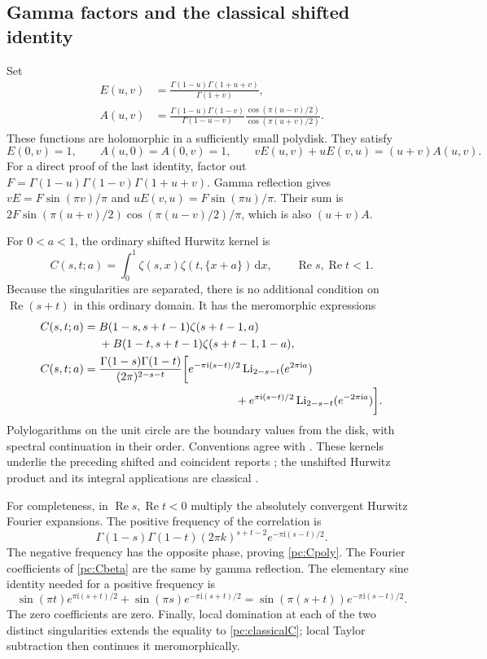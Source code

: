 \documentclass[11pt,a4paper]{article}
\numberwithin{equation}{section}
\theoremstyle{definition}
\newcommand{\ii}{\mathrm i}
\newcommand{\dd}{\,\mathrm d}
\newcommand{\Li}{\operatorname{Li}}
\newcommand{\Rea}{\operatorname{Re}}
\begin{document}
\subsection{Gamma factors and the classical shifted identity}
Set
\begin{align}
E(u,v)&=\frac{\Gamma(1-u)\Gamma(1+u+v)}{\Gamma(1+v)},\label{pc:E}\\
A(u,v)&=\frac{\Gamma(1-u)\Gamma(1-v)}{\Gamma(1-u-v)}
\frac{\cos(\pi(u-v)/2)}{\cos(\pi(u+v)/2)}.\label{pc:A}
\end{align}
These functions are holomorphic in a sufficiently small polydisk. They satisfy
\begin{equation}\label{pc:EA}
E(0,v)=1,\qquad A(u,0)=A(0,v)=1,\qquad
vE(u,v)+uE(v,u)=(u+v)A(u,v).
\end{equation}
For a direct proof of the last identity, factor out
$F=\Gamma(1-u)\Gamma(1-v)\Gamma(1+u+v)$. Gamma reflection gives
$vE=F\sin(\pi v)/\pi$ and $uE(v,u)=F\sin(\pi u)/\pi$.
Their sum is $2F\sin(\pi(u+v)/2)\cos(\pi(u-v)/2)/\pi$, which is also $(u+v)A$.

For $0<a<1$, the ordinary shifted Hurwitz kernel is
\begin{equation}\label{pc:classicalC}
C(s,t;a)=\int_0^1\zeta(s,x)\zeta(t,\{x+a\})\dd x,
\qquad \Rea s,\Rea t<1.
\end{equation}
Because the singularities are separated, there is no additional condition on $\Rea(s+t)$ in this ordinary domain. It has the meromorphic expressions
\begin{align}
C(s,t;a)={}&B(1-s,s+t-1)\zeta(s+t-1,a)\notag\\
&+B(1-t,s+t-1)\zeta(s+t-1,1-a),\label{pc:Cbeta}\\
C(s,t;a)={}&\frac{\Gamma(1-s)\Gamma(1-t)}{(2\pi)^{2-s-t}}
\bigg[e^{-\pi\ii(s-t)/2}\Li_{2-s-t}(e^{2\pi\ii a})\notag\\
&\hspace{42mm}+e^{\pi\ii(s-t)/2}\Li_{2-s-t}(e^{-2\pi\ii a})\bigg].\label{pc:Cpoly}
\end{align}
Polylogarithms on the unit circle are the boundary values from the disk, with spectral continuation in their order. Conventions agree with \cite{pc:polylog}. These kernels underlie the preceding shifted and coincident reports \cite{pc:coincident,pc:shifted}; the unshifted Hurwitz product and its integral applications are classical \cite{pc:EM}.

For completeness, in $\Rea s,\Rea t<0$ multiply the absolutely convergent Hurwitz Fourier expansions. The positive frequency of the correlation is
\[
\Gamma(1-s)\Gamma(1-t)(2\pi k)^{s+t-2}e^{-\pi\ii(s-t)/2}.
\]
The negative frequency has the opposite phase, proving \eqref{pc:Cpoly}. The Fourier coefficients of \eqref{pc:Cbeta} are the same by gamma reflection. The elementary sine identity needed for a positive frequency is
\[
\sin(\pi t)e^{\pi\ii(s+t)/2}+\sin(\pi s)e^{-\pi\ii(s+t)/2}
=\sin(\pi(s+t))e^{-\pi\ii(s-t)/2}.
\]
The zero coefficients are zero. Finally, local domination at each of the two distinct singularities extends the equality to \eqref{pc:classicalC}; local Taylor subtraction then continues it meromorphically.
\end{document}
